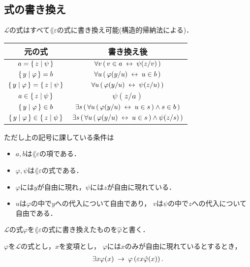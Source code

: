 \newpage
\subsection{式の書き換え}
	$\mathcal{L}$の式はすべて$\lang{\varepsilon}$の式に書き換え可能(構造的帰納法による)．
	
	\begin{table}[H]
		\begin{center}
		\begin{tabular}{c|c}
			元の式 & 書き換え後 \\ \hline \hline
			$a = \left\{\, z \mid \psi\, \right\}$ & $\forall v\, (\, v \in a \hspace{0.25em}\leftrightarrow\hspace{0.25em} \psi(z/v)\, )$ \\ \hline
			$\left\{\, y \mid \varphi\, \right\} = b$ & $\forall u\, (\, \varphi(y/u) \hspace{0.25em}\leftrightarrow\hspace{0.25em} u \in b\, )$ \\ \hline
			$\left\{\, y \mid \varphi\, \right\} = \left\{\, z \mid \psi\, \right\}$ & $\forall u\, (\, \varphi(y/u) \hspace{0.25em}\leftrightarrow\hspace{0.25em} \psi(z/u)\, )$ \\ \hline
			$a \in \left\{\, z \mid \psi\, \right\}$ & $\psi(z/a)$ \\ \hline
			$\left\{\, y \mid \varphi\, \right\} \in b$ & $\exists s\, (\, \forall u\, (\, \varphi(y/u) \hspace{0.25em}\leftrightarrow\hspace{0.25em} u \in s\, ) \wedge s \in b\, )$ \\ \hline
			$\left\{\, y \mid \varphi\, \right\} \in \left\{\, z \mid \psi\, \right\}$ & $\exists s\, (\, \forall u\, (\, \varphi(y/u) \hspace{0.25em}\leftrightarrow\hspace{0.25em} u \in s\, ) \wedge \psi(z/s)\, )$ \\ \hline
		\end{tabular}
		\end{center}
	\end{table}
	
	ただし上の記号に課している条件は
	\begin{itemize}
		\item $a,b$は$\lang{\varepsilon}$の項である．
		\item $\varphi,\psi$は$\lang{\varepsilon}$の式である．
		\item $\varphi$には$y$が自由に現れ，$\psi$には$z$が自由に現れている．
		\item $u$は$\varphi$の中で$y$への代入について自由であり，
			$v$は$\psi$の中で$z$への代入について自由である．
	\end{itemize}
	
\newpage
	$\mathcal{L}$の式$\varphi$を$\lang{\varepsilon}$の式に書き換えたものを$\hat{\varphi}$と書く．
	
	\begin{screen}
		\begin{logicalaxm}
			$\varphi$を$\mathcal{L}$の式とし，$x$を変項とし，
			$\varphi$には$x$のみが自由に現れているとするとき，
			\begin{align}
				\exists x \varphi(x) \hspace{0.25em}\rightarrow\hspace{0.25em} 
				\varphi\left(\varepsilon x \hat{\varphi}(x)\right).
			\end{align}
		\end{logicalaxm}
	\end{screen}
	
